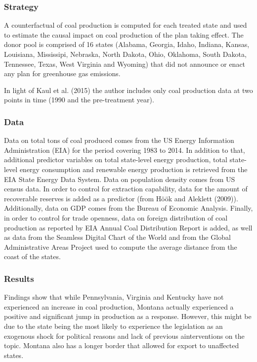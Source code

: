 \documentclass[12pt,a4paper,draft]{article}
\begin{document}
\subsubsection*{Strategy}
A counterfactual of coal production is computed for each treated state and used to 
estimate the causal impact on coal production of the plan taking effect. 
The donor pool is comprised of 16 states (Alabama, Georgia, Idaho, Indiana, Kansas, 
Louisiana, Mississipi, Nebraska, North Dakota, Ohio, Oklahoma, South Dakota, Tennessee, 
Texas, West Virginia and Wyoming) that did not announce or enact any plan for 
greenhouse gas emissions.

In light of Kaul et al. (2015) the author includes only coal production data at two 
points in time (1990 and the pre-treatment year).


\subsubsection*{Data}
Data on total tons of coal produced comes from the US Energy Information Administration 
(EIA) for the period covering 1983 to 2014. In addition to that, additional predictor 
variables on total state-level energy production, total state-level energy consumption 
and renewable energy production is retrieved from the EIA State Energy Data System. 
Data on population density comes from US census data. 
In order to control for extraction capability, data for the amount of recoverable 
reserves is added as a predictor (from Höök and Aleklett (2009)). Additionally, data on 
GDP comes from the Bureau of Economic Analysis. 
Finally, in order to control for trade openness, data on foreign distribution of coal 
production as reported by EIA Annual Coal Distribution Report is added, as well as data 
from the Seamless Digital Chart of the World and from the Global Administrative Areas 
Project used to compute the average distance from the coast of the states. 

\subsubsection*{Results}
Findings show that while Pennsylvania, Virginia and Kentucky have not experienced an 
increase in coal production, Montana actually experienced a positive and significant 
jump in production as a response. 
However, this might be due to the state being the most likely to experience the 
legislation as an exogenous shock for political reasons and lack of previous ainterventions 
on the topic. Montana also has a longer border that allowed for export to unaffected 
states.
 
\end{document}
